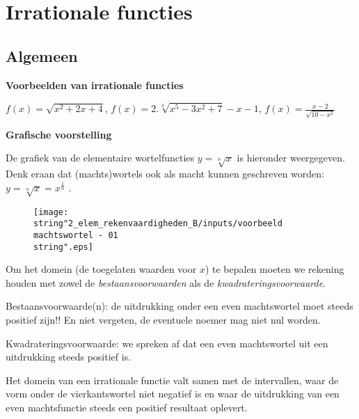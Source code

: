 \section{Irrationale functies}


\subsection{Algemeen}

\noindent \textbf{Voorbeelden van irrationale functies}

\noindent ${\displaystyle f(x)=\sqrt{x^{2}+2x+4}}$, ${\displaystyle f(x)=2.\sqrt[3]{x^{5}-3x^{2}+7}-x-1}$,
${\displaystyle f(x)=\frac{x-2}{\sqrt{10-x^{2}}}}$

\noindent \textbf{Grafische voorstelling}

De grafiek van de elementaire wortelfuncties ${\displaystyle y=\sqrt[n]{x}}$
is hieronder weergegeven. Denk eraan dat (machts)wortels ook als macht
kunnen geschreven worden: ${\displaystyle y=\sqrt[n]{x}}=x^{\frac{1}{n}}$
.

\begin{figure}[h]
\centering
\texttt{[image: \\string"2\_elem\_rekenvaardigheden\_B/inputs/voorbeeld machtswortel - 01\\string".eps]}
\end{figure}
\medskip{}


Om het domein (de toegelaten waarden voor $x$) te bepalen moeten
we rekening houden met zowel de \emph{bestaansvoorwaarden} als de
\emph{kwadrateringsvoorwaarde}.

Bestaansvoorwaarde(n): de uitdrukking onder een even machtswortel
moet steeds positief zijn!! En niet vergeten, de eventuele noemer
mag niet nul worden.

Kwadrateringsvoorwaarde: we spreken af dat een even machtswortel uit
een uitdrukking steeds positief is.

Het domein van een irrationale functie valt samen met de intervallen,
waar de vorm onder de vierkantswortel niet negatief is en waar de
uitdrukking van een even machtsfunctie steeds een positief resultaat
oplevert.

